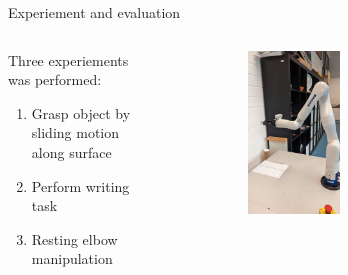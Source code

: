 \documentclass[aspectratio=169]{beamer}
\begin{document}
\begin{frame}{Experiement and evaluation}
  \begin{columns}[c]
    \begin{column}{.5\textwidth}
      Three experiements was performed:
      \begin{enumerate}
        \item Grasp object by sliding motion along surface
        \item Perform writing task
        \item Resting elbow manipulation
      \end{enumerate}     
    \end{column}
    \begin{column}{.5\textwidth}
    \begin{figure}
      \centering
      \begin{figure}
        \includegraphics[width=0.5\textwidth]{images/us1_initial.jpg}
      \end{figure}
    \end{figure}
    \end{column}
    \end{columns}
  \end{frame}
\end{document}
